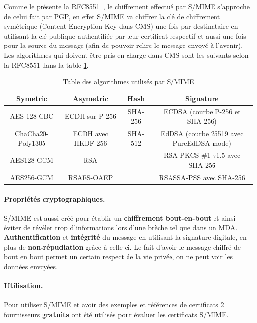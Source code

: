 Comme le présente la RFC8551~\cite{RFC8551}, le chiffrement effectué par S/MIME s'approche de celui fait par PGP, en effet S/MIME va chiffrer la clé de chiffrement symétrique (Content Encryption Key dans CMS) une fois par destinataire en utilisant la clé publique authentifiée par leur certificat respectif et aussi une fois pour la source du message (afin de pouvoir relire le message envoyé à l'avenir). Les algorithmes qui doivent être pris en charge dans CMS sont les suivants selon la RFC8551 dans la table \ref{table:refSMIMEAlgos}.

\begin{table}[h!]
	\centering
	\caption{Table des algorithmes utilisés par S/MIME}
	\label{table:refSMIMEAlgos}
	\begin{adjustbox}{width=\textwidth}
		\begin{tabular}{||c c c c||}
			\hline
			Symetric & Asymetric & Hash & Signature \\ [0.5ex]
			\hline\hline
			AES-128 CBC & ECDH sur P-256 & SHA-256 & ECDSA (courbe P-256 et SHA-256) \\
			ChaCha20-Poly1305 & ECDH  avec HKDF-256 & SHA-512 & EdDSA (courbe 25519 avec PureEdDSA mode) \\
			AES128-GCM & RSA & & RSA PKCS \#1 v1.5 avec SHA-256 \\
			AES256-GCM & RSAES-OAEP & & RSASSA-PSS avec SHA-256\\
			\hline
		\end{tabular}
	\end{adjustbox}
	
\end{table}
\paragraph*{Propriétés cryptographiques.}
S/MIME est aussi créé pour établir un \textbf{chiffrement bout-en-bout} et ainsi éviter de révéler trop d'informations lors d'une brèche tel que dans un MDA. 
\textbf{Authentification} et \textbf{intégrité} du message en utilisant la signature digitale, en plus de \textbf{non-répudiation} grâce à celle-ci. Le fait d'avoir le message chiffré de bout en bout permet un certain respect de la vie privée, on ne peut voir les données envoyées.
\paragraph*{Utilisation.}
Pour utiliser S/MIME et avoir des exemples et références de certificats 2 fournisseurs \textbf{gratuits} ont été utilisés pour évaluer les certificats S/MIME.

